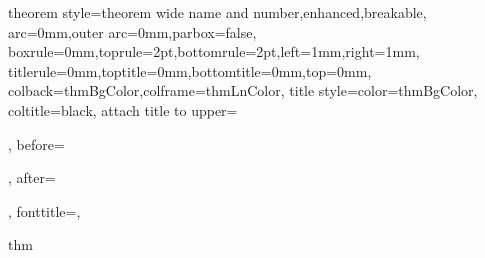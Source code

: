\newcommand{\highlight}[1]{\textbf{\textsf{\textcolor{myColorMainA}{#1}}}}
\newcommand{\symbdefbox}[2]{\highlight{#1 #2}\mathmarginbox{#2}}
\newcommand{\mathmarginbox}[1]{\myMarginnote{\scalebox{1.5}{\ifthispageodd{$\blacktriangleleft$}{\null} #1 \ifthispageodd{\null}{$\blacktriangleright$}}}}
\newcommand{\example}[1]{\small\examplebox{\textit{Example:} #1}}

\newcommand{\mscal}[1]{\langle#1\rangle}
\newcommand{\mvec}[1]{\mathbf{#1}}

\usepackage{amsmath,amsthm,amsfonts}
\usepackage{lipsum}

\usepackage{tcolorbox}
\usepackage{changepage}%


\makeatletter
\def\tcb@theo@widetitle#1#2#3{\hbox to \textwidth{\textsc{\large#1}\normalsize\space#3\hfil(#2)}}
\makeatother

%
{theorem style=theorem wide name and number,enhanced,breakable,
	arc=0mm,outer arc=0mm,parbox=false,
	boxrule=0mm,toprule=2pt,bottomrule=2pt,left=1mm,right=1mm,
	titlerule=0mm,toptitle=0mm,bottomtitle=0mm,top=0mm,
	colback=thmBgColor,colframe=thmLnColor,
	title style={color=thmBgColor}, coltitle=black,
	attach title to upper={\par\noindent},
	before={\par}, after={\par},
	fonttitle=\normalfont\large,
}{thm}

\newenvironment{theorem}[2][]{\noindent\mytheorem{#1}{#2}}{\endmytheorem}

\let\realproof\proof
\let\realendproof\endproof
\renewenvironment{proof}[1][Proof]{\ProofBox\strut\textsc{#1}\space}{\endProofBox}

